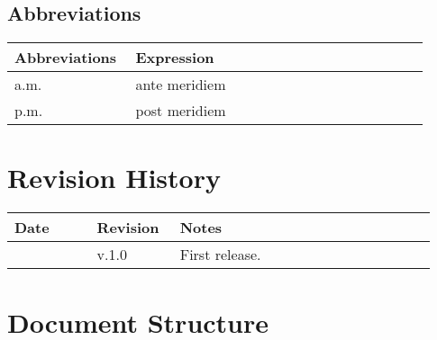 \subsection{Abbreviations}

\begin{center}
	\begin{tabular}{@{}p{0.28\linewidth} p{0.68\linewidth}@{}}
		\toprule
		\textbf{Abbreviations}  & \textbf{Expression}\\
		\midrule
	    a.m. & ante meridiem\\
	    p.m. & post meridiem\\
		\bottomrule
	\end{tabular}
\end{center}

\section{Revision History}

\begin{center}
	\begin{tabular}{@{}p{0.18\linewidth} p{0.18\linewidth} p{0.57\linewidth}@{}}
		\toprule
		\textbf{Date}   & \textbf{Revision} & \textbf{Notes}\\
		\midrule
		\date{}         & v.1.0             & First release.\\
		\bottomrule
	\end{tabular}
\end{center}

\printbibliography[title={Reference Documents},keyword=intro, heading=subbibnumbered]

\section{Document Structure}


